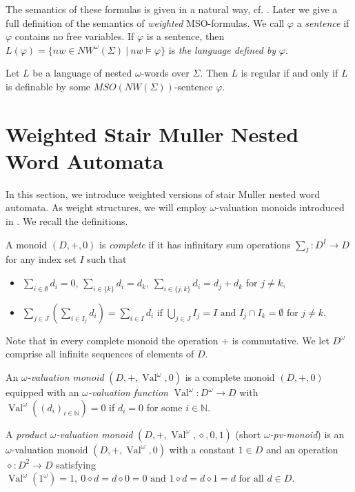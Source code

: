 \documentclass[runningheads, envcountsame, a4paper]{llncs}
\DeclareMathOperator{\Val}{Val}
\begin{document}
The semantics of these formulas is given in a natural way, cf. \cite{AM}. Later we give a full definition of the semantics of \emph{weighted} MSO-formulas. 
We call $\varphi$ a \emph{sentence} if $\varphi$ contains no free variables. If $\varphi$ is a sentence, then
$L(\varphi)=\{\mathit{nw} \in \mathit{NW^\omega}(\Sigma)~|~\mathit{nw} \models \varphi\}$
is \emph{the language defined by} $\varphi$.
\begin{Theorem} \label{regMSOD} Let $L$ be a language of nested $\omega$-words over $\Sigma$. Then $L$ is regular if and only if $L$ is definable by some $\mathit{MSO}(\mathit{NW}(\Sigma))$-sentence $\varphi$. 
\end{Theorem}
\section{Weighted Stair Muller Nested Word Automata} \label{kapomega} In this section, we introduce weighted versions of stair Muller nested word automata. As weight structures, we will employ $\omega$-valuation monoids introduced in \cite{DM}. We recall the definitions.
\par
A monoid $(D,+,0)$ is \emph{complete} if it has infinitary sum operations
	$\sum_I:D^I \rightarrow D$
	for any index set $I$ such that
	\begin{itemize}
		\item $\sum_{i \in \emptyset} d_i = 0$,
		 $\sum_{i \in \{k\}} d_i = d_k$,
		 $\sum_{i \in \{j,k\}} d_i = d_j+d_k$ for $j \neq k$,
		\item $\sum_{j \in J}(\sum_{i \in I_j} d_i ) = \sum_{i \in I} d_i \text{ if } \bigcup_{j \in J} I_j = I \text{ and } I_j \cap I_k = \emptyset \text{ for } j \neq k$.
	\end{itemize}
	Note that in every complete monoid the operation $+$ is commutative.
We let $D^\omega$ comprise all infinite sequences of elements of $D$.
\begin{Def}
	An \emph{$\omega$-valuation monoid} $(D,+,\Val^\omega,0)$ is a complete monoid $(D,+,0)$ equipped with an \emph{$\omega$-valuation function}
$\Val^\omega:D^\omega \rightarrow D$ with $\Val^\omega((d_i)_{i \in \mathbb{N}})=0$ if $d_i=0$ for some $i \in \mathbb{N}$.\par
	A \emph{product $\omega$-valuation monoid} $(D,+,\Val^\omega, \diamond,0,1)$ (short \emph{$\omega$-pv-monoid}) is an $\omega$-valuation monoid $(D,+,\Val^\omega,0)$ with a constant $1 \in D$ and an operation $\diamond:D^2 \rightarrow D$ satisfying $\Val^\omega(1^\omega)=1,~0 \diamond d= d \diamond 0 = 0 \text{ and } 1 \diamond d = d \diamond 1 = d \text{ for all } d \in D$.
\end{Def}
\end{document}
